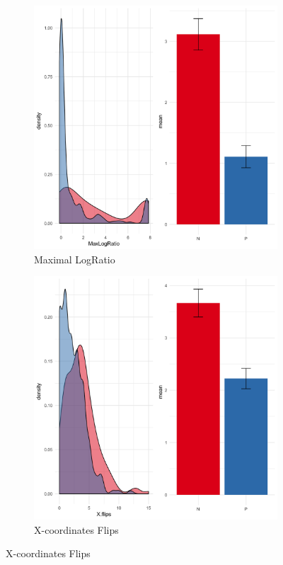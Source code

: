 \documentclass{article}
\begin{document}
\begin{itemize}
\begin{figure}
%
\begin{subfigure}[b]{0.4\textwidth}
\includegraphics[width=\textwidth]{MaxLogRatio-negation.png}
\caption{Maximal LogRatio}
\end{subfigure}
%
\begin{subfigure}[b]{0.4\textwidth}
\includegraphics[width=\textwidth]{Xflips-negation.png}
\caption{X-coordinates Flips}
\end{subfigure}


\end{figure}
\end{itemize}
\end{document}
